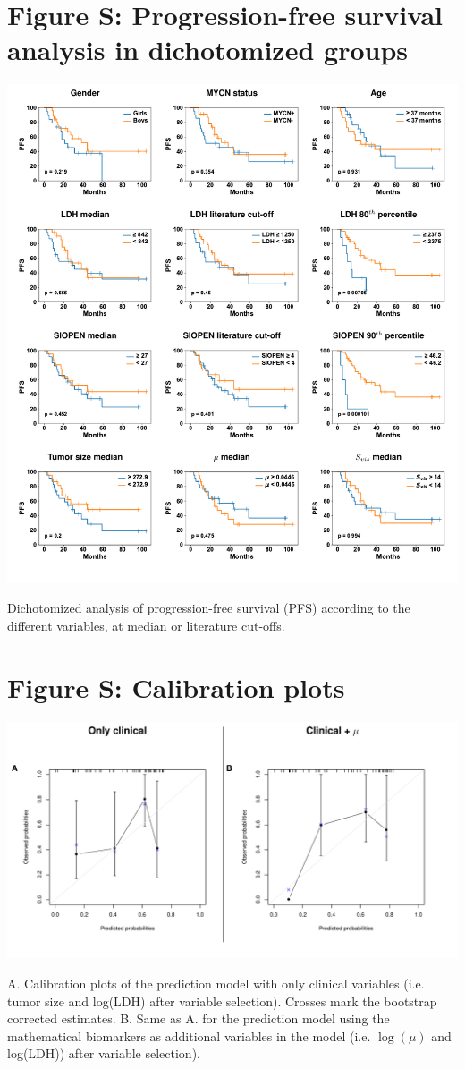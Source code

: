 \documentclass[11pt]{article}
\newcounter{fignb}  %
\begin{document}
\section{Figure S: Progression-free survival analysis in dichotomized groups}
\spaceV
\begin{center}
\includegraphics[width=1\textwidth]{figure_S6}
\end{center}
Dichotomized analysis of progression-free survival (PFS) according to the different variables, at median or literature cut-offs.
\newpage
{}
\section{Figure S: Calibration plots}
\spaceV
\begin{center}
\includegraphics[width=1\textwidth]{figure_S7}
\end{center}
A. Calibration plots of the prediction model with only clinical variables (i.e. tumor size and log(LDH) after variable selection). Crosses mark the bootstrap corrected estimates.
B. Same as A. for the prediction model using the mathematical biomarkers as additional variables in the model (i.e. $\log(\mu)$ and log(LDH)) after variable selection).
\end{document}
